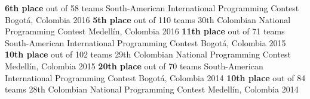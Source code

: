 
\begin{cvhonors}
  \cvhonor
    {\textbf{6th place} out of 58 teams}
    {South-American International Programming Contest}
    {Bogotá, Colombia}
    {2016}
  \cvhonor
    {\textbf{5th place} out of 110 teams}
    {30th Colombian National Programming Contest}
    {Medellín, Colombia}
    {2016}
  \cvhonor
    {\textbf{11th place} out of 71 teams}
    {South-American International Programming Contest}
    {Bogotá, Colombia}
    {2015}
  \cvhonor
    {\textbf{10th place} out of 102 teams}
    {29th Colombian National Programming Contest}
    {Medellín, Colombia}
    {2015}
  \cvhonor
    {\textbf{20th place} out of 70 teams}
    {South-American International Programming Contest}
    {Bogotá, Colombia}
    {2014}
  \cvhonor
    {\textbf{10th place} out of 84 teams}
    {28th Colombian National Programming Contest}
    {Medellín, Colombia}
    {2014}
\end{cvhonors}

